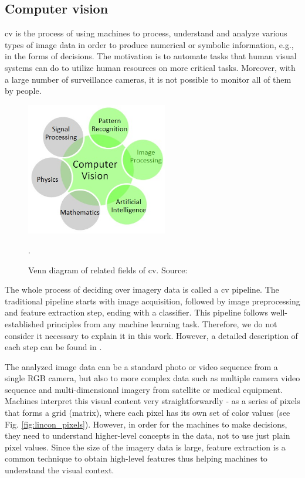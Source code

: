     \subsection{Computer vision}
        \Gls{cv} is the process of using machines to process, understand and analyze various types of image data in order to produce numerical or symbolic information, e.g., in the forms of decisions. The motivation is to automate tasks that human visual systems can do to utilize human resources on more critical tasks. Moreover, with a large number of surveillance cameras, it is not possible to monitor all of them by people. 
        
        \begin{figure}[ht]
            \centering
            \includegraphics[width=0.55\textwidth]{resources/computer-vision-venn.png}
            \caption{Venn diagram of related fields of \gls{cv}. Source: \cite{khandelwalcv}}.
            \label{fig:convolutional neural netwok}
        \end{figure}
        
        The whole process of deciding over imagery data is called a \gls{cv} pipeline. The traditional pipeline starts with image acquisition, followed by image preprocessing and feature extraction step, ending with a classifier. This pipeline follows well-established principles from any machine learning task. Therefore, we do not consider it necessary to explain it in this work. However, a detailed description of each step can be found in \cite{koenpieline}.
    
        The analyzed image data can be a standard photo or video sequence from a single RGB camera, but also to more complex data such as multiple camera video sequence and multi-dimensional imagery from satellite or medical equipment. Machines interpret this visual content very straightforwardly - as a series of pixels that forms a grid (matrix), where each pixel has its own set of color values (see Fig. \ref{fig:lincon_pixels}). However, in order for the machines to make decisions, they need to understand higher-level concepts in the data, not to use just plain pixel values. Since the size of the imagery data is large, feature extraction is a common technique to obtain high-level features thus helping machines to understand the visual context. 
        
